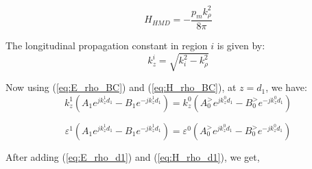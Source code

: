 \documentclass{article}
\begin{document}
  \begin{equation}
    H_{HMD} = -\frac{p_m k_{\rho}^2}{8 \pi}
    \label{eq:H_HMD}
  \end{equation}

  The longitudinal propagation constant in region $i$ is given by:
  \begin{equation}
    k_z^i = \sqrt{k_i^2 - k_{\rho}^2}
    \label{eq:k}
  \end{equation}

  Now using (\ref{eq:E_rho_BC}) and (\ref{eq:H_rho_BC}), at $z=d_1$, we have:
  \begin{equation}
    k_z^1 \left( A_1 e^{jk_z^1 d_1} - B_1 e^{-jk_z^1 d_1}  \right) = k_z^{0} \left( A_{0}^> e^{jk_z^{0} d_1} - B_{0}^> e^{-jk_z^{0} d_1}  \right)
    \label{eq:E_rho_d1}
  \end{equation}

  \begin{equation}
    \varepsilon^1 \left( A_1 e^{jk_z^1 d_1} - B_1 e^{-jk_z^1 d_1}  \right) = \varepsilon^{0} \left( A_{0}^> e^{jk_z^{0} d_1} - B_{0}^> e^{-jk_z^{0} d_1}  \right)
    \label{eq:H_rho_d1}
  \end{equation}

  After adding (\ref{eq:E_rho_d1}) and (\ref{eq:H_rho_d1}), we get,




  
  
\end{document}
